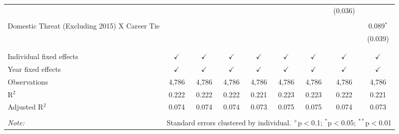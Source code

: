 \documentclass[12pt,letterpaper]{article}
\begin{document}
\begin{table}[!htbp]
\begin{tabular}{@{\extracolsep{5pt}}lcccccccc}
		&  &  &  &  &  &  & (0.036) &  \\ 
		& & & & & & & & \\ 
		Domestic Threat (Excluding 2015) X Career Tie &  &  &  &  &  &  &  & 0.089$^{*}$ \\ 
		&  &  &  &  &  &  &  & (0.039) \\ 
		& & & & & & & & \\ 
		\hline \\[-1.8ex] 
		Individual fixed effects & $\checkmark$ & $\checkmark$ & $\checkmark$ & $\checkmark$ & $\checkmark$ & $\checkmark$ & $\checkmark$ & $\checkmark$ \\ 
		Year fixed effects & $\checkmark$ & $\checkmark$ & $\checkmark$ & $\checkmark$ & $\checkmark$ & $\checkmark$ & $\checkmark$ & $\checkmark$ \\ 
		Observations & 4,786 & 4,786 & 4,786 & 4,786 & 4,786 & 4,786 & 4,786 & 4,786 \\ 
		R$^{2}$ & 0.222 & 0.222 & 0.222 & 0.221 & 0.223 & 0.223 & 0.222 & 0.221 \\ 
		Adjusted R$^{2}$ & 0.074 & 0.074 & 0.074 & 0.073 & 0.075 & 0.075 & 0.074 & 0.073 \\ 
		\hline 
		\hline \\[-1.8ex] 
		\textit{Note:}  & \multicolumn{8}{r}{Standard errors clustered by individual. $^{+}$p$<$0.1; $^{*}$p$<$0.05; $^{**}$p$<$0.01}} \\ 
\end{tabular}
\end{table} 
\end{document}
